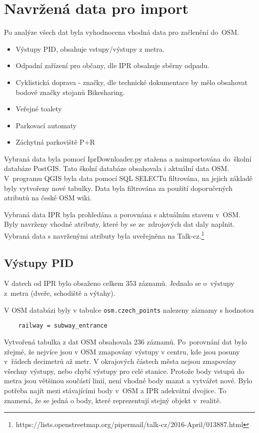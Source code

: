 \section{Navržená data pro import}
\label{Navržená data pro import}

Po analýze všech dat byla vyhodnocena vhodná data pro začlenění
do~OSM.

\begin{itemize}
    \item   Výstupy PID, obsahuje vstupy/výstupy z metra.
    \item   Odpadní zařízení pro občany, dle IPR obsahuje sběrny
                odpadu. 
    \item   Cyklistická doprava - značky, dle technické dokumentace by
                mělo 
            obsahovat bodové značky stojanů Bikesharing.
    \item   Veřejné toalety
    \item   Parkovací automaty
    \item   Záchytná parkoviště P+R
\end{itemize}

Vybraná data byla pomocí IprDownloader.py stažena a naimportována
do~škol\-ní databáze PostGIS. Tato školní databáze obsahovala i aktuální data OSM. V~programu QGIS byla data pomocí SQL SELECTu
filtrována, na jejich základě byly vytvořeny nové tabulky. Data byla filtrována za použití doporučených atributů na české
OSM wiki. \cite{OSMfeatures}

Vybraná data IPR byla prohledána a porovnána s aktuálním stavem v~OSM.
Byly navrženy vhodné atributy, které by se ze~zdrojových dat daly
naplnit. Vybraná data s navrženými atributy byla uveřejněna na Talk-cz.\footnote{https://lists.openstreetmap.org/pipermail/talk-cz/2016-April/013887.html}


\subsection{Výstupy PID}
\label{Výstupy PID}
V datech od IPR bylo obsaženo celkem 353 záznamů. Jednalo se
o~výstupy z~metra (dveře, schodiště a výtahy).

V OSM databázi byly v tabulce {\tt osm.czech\_points}
nalezeny záznamy s hodnotou
\begin{verbatim}
    railway = subway_entrance
\end{verbatim}
Vytvořená tabulka z dat OSM obsahovala 236 záznamů. Po~porovnání dat
bylo zřejmé, že nejvíce jsou v OSM zmapovány výstupy v centru, kde
jsou posuny v~řádech decimetrů až metr. V okrajových částech města
nejsou zmapovány všechny výstupy, nebo chybí výstupy pro celé stanice.
Protože body vstupů do metra jsou většinou součástí linií, není vhodné
body mazat a vytvářet nové. Bylo potřeba najít mezi stávajícími body
v~OSM a IPR adekvátní dvojice. To znamená, že se jedná o body, které
reprezentují stejný objekt v~realitě.

